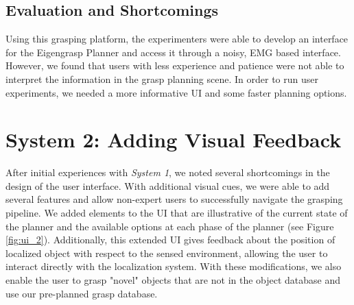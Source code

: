 \subsection{Evaluation and Shortcomings}
Using this grasping platform, the experimenters were able to develop an interface for the Eigengrasp Planner and access it through a noisy, EMG based interface. However, we found that users with less experience and patience were not able to interpret the information in the grasp planning scene. In order to run user experiments, we needed a more informative UI and some faster planning options.

\section*{System 2: Adding Visual Feedback}
\setcounter{subsection}{0}
\renewcommand*{\theHsection}{chX.\the\value{section}}
After initial experiences with \emph{System 1}, we noted several shortcomings in the design of the user interface. With additional visual cues, we were able to add several features and allow non-expert users to successfully navigate the grasping pipeline. We added elements to the UI that are illustrative of the current state of the planner and the available options at each phase of the planner (see Figure \ref{fig:ui_2}). Additionally, this extended UI gives feedback about the position of localized object with respect to the sensed environment, allowing the user to interact directly with the localization system. With these modifications, we also enable the user to grasp "novel" objects that are not in the object database and use our pre-planned grasp database. 

